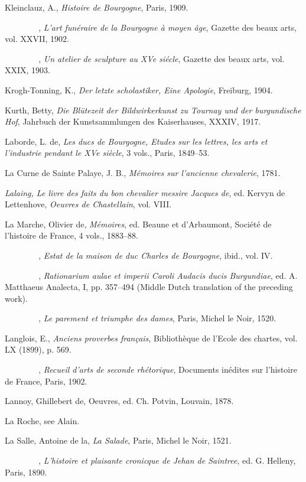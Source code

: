 Kleinclauz, A., \emph{Histoire de Bourgogne}, Paris, 1909.

\emph{{~~~~~~~~}}, \emph{L'art funéraire de la Bourgogne à moyen âge},
Gazette des beaux arts, vol. XXVII, 1902.

\emph{{~~~~~~~~}}, \emph{Un atelier de sculpture au XVe siécle}, Gazette
des beaux arts, vol. XXIX, 1903.

Krogh-Tonning, K., \emph{Der letzte scholastiker, Eine Apologie},
Freiburg, 1904.

Kurth, Betty, \emph{Die Blütezeit der Bildwirkerkunst zu Tournay und der
burgundische Hof}, Jahrbuch der Kunstsammlungen des Kaiserhauses, XXXIV,
1917.

\protect\hypertarget{24_BIBLIOGRAPHY.xhtmlux5cux23page_446}{}{}Laborde,
L. de, \emph{Les ducs de Bourgogne, Etudes sur les lettres, les arts et
l'industrie pendant le XVe siècle}, 3 vols., Paris, 1849--53.

La Curne de Sainte Palaye, J. B., \emph{Mémoires sur l'ancienne
chevalerie}, 1781.

\emph{Lalaing, Le livre des faits du bon chevalier messire Jacques de},
ed. Kervyn de Lettenhove, \emph{Oeuvres de Chastellain}, vol. VIII.

La Marche, Olivier de, \emph{Mémoires}, ed. Beaune et d'Arbaumont,
Société de l'histoire de France, 4 vols., 1883--88.

\emph{{~~~~~~~~}}, \emph{Estat de la maison de duc Charles de
Bourgogne}, ibid., vol. IV.

\emph{{~~~~~~~~}}, \emph{Rationarium aulae et imperii Caroli Audacis
ducis Burgundiae}, ed. A. Matthaeus Analecta, I, pp. 357--494 (Middle
Dutch translation of the preceding work).

\emph{{~~~~~~~~}}, \emph{Le parement et triumphe des dames}, Paris,
Michel le Noir, 1520.

Langlois, E., \emph{Anciens proverbes français}, Bibliothèque de l'Ecole
des chartes, vol. LX (1899), p. 569.

\emph{{~~~~~~~~}}, \emph{Recueil d'arts de seconde rhétorique},
Documents inédites sur l'histoire de France, Paris, 1902.

Lannoy, Ghillebert de, Oeuvres, ed. Ch. Potvin, Louvain, 1878.

La Roche, see Alain.

La Salle, Antoine de la, \emph{La Salade}, Paris, Michel le Noir, 1521.

\emph{{~~~~~~~~}}, \emph{L'histoire et plaisante cronicque de Jehan de
Saintree}, ed. G. Helleny, Paris, 1890.


